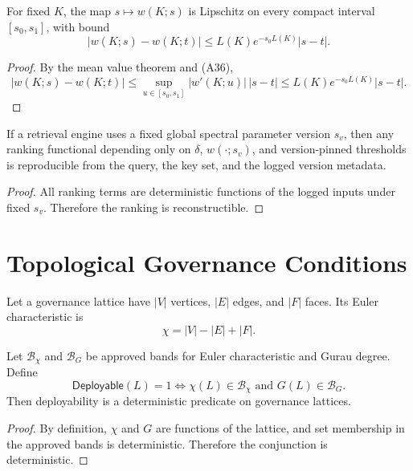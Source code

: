 \documentclass[11pt]{article}
\begin{document}
\begin{proposition}
For fixed \(K\), the map \(s \mapsto w(K;s)\) is Lipschitz on every compact interval \([s_0,s_1]\), with bound
\[
|w(K;s)-w(K;t)| \le L(K)e^{-s_0L(K)}|s-t|. \tag{A37}
\]
\end{proposition}

\begin{proof}
By the mean value theorem and (A36),
\[
|w(K;s)-w(K;t)| \le \sup_{u\in[s_0,s_1]} |w'(K;u)|\,|s-t|
\le L(K)e^{-s_0L(K)}|s-t|. \tag{A38}
\]
\end{proof}

\begin{corollary}
If a retrieval engine uses a fixed global spectral parameter version \(s_v\), then any ranking functional depending only on \(\delta\), \(w(\cdot;s_v)\), and version-pinned thresholds is reproducible from the query, the key set, and the logged version metadata.
\end{corollary}

\begin{proof}
All ranking terms are deterministic functions of the logged inputs under fixed \(s_v\). Therefore the ranking is reconstructible.
\end{proof}

\section{Topological Governance Conditions}
\begin{definition}
Let a governance lattice have \(|V|\) vertices, \(|E|\) edges, and \(|F|\) faces. Its Euler characteristic is
\[
\chi = |V| - |E| + |F|. \tag{A39}
\]
\end{definition}

\begin{proposition}
Let \(\mathcal{B}_\chi\) and \(\mathcal{B}_G\) be approved bands for Euler characteristic and Gurau degree. Define
\[
\mathsf{Deployable}(L)=1 \iff \chi(L)\in \mathcal{B}_\chi \text{ and } G(L)\in \mathcal{B}_G. \tag{A40}
\]
Then deployability is a deterministic predicate on governance lattices.
\end{proposition}

\begin{proof}
By definition, \(\chi\) and \(G\) are functions of the lattice, and set membership in the approved bands is deterministic. Therefore the conjunction is deterministic.
\end{proof}
\end{document}
